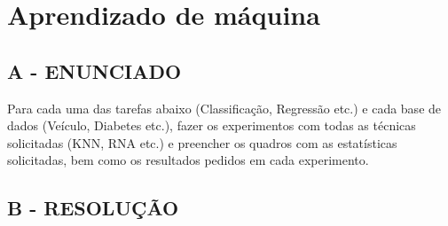 \label{ap:ap08}
\chapter{Aprendizado de máquina}
\section*{\textbf{A - ENUNCIADO}}
Para cada uma das tarefas abaixo (Classificação, Regressão etc.) e cada base de dados (Veículo, Diabetes etc.), fazer os
experimentos com todas as técnicas solicitadas (KNN, RNA etc.) e preencher os quadros com as estatísticas solicitadas,
bem como os resultados pedidos em cada experimento.

\section*{\textbf{B - RESOLUÇÃO}}
\lipsum[30]